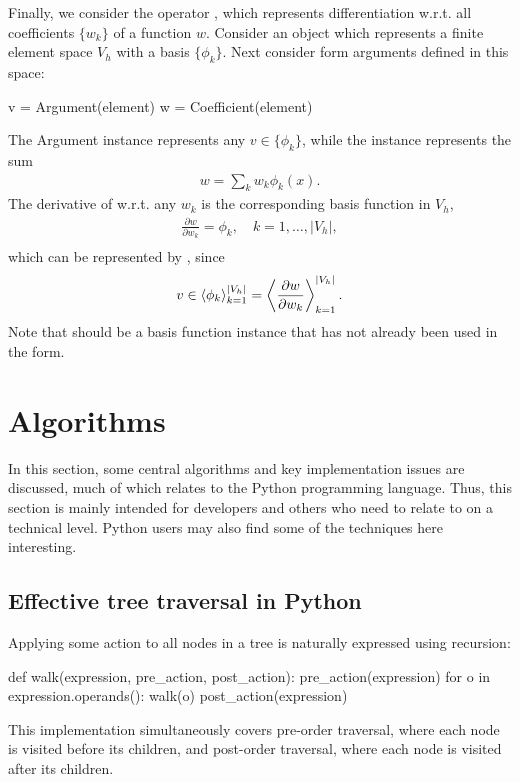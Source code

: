 Finally, we consider the operator , which represents
differentiation w.r.t. all coefficients $\{w_k\}$ of a function $w$.
Consider an object  which represents a finite element space
$V_h$ with a basis $\{\phi_k\}$.  Next consider form arguments defined
in this space:
\begin{python}
v = Argument(element)
w = Coefficient(element)
\end{python}
The Argument instance  represents any $v\in\{\phi_k\}$,
while the  instance  represents the sum
\begin{align}
w = \sum_k w_k \phi_k(x).
\end{align}
The derivative of  w.r.t. any $w_k$ is the corresponding basis
function in $V_h$,
\begin{align}
\frac{\partial w}{\partial w_k} = \phi_k, \quad k = 1, \ldots, |V_h|, \\
\end{align}
which can be represented by , since
\begin{align}
v \in \left\langle{ \phi_k }\right\rangle_{k=1}^{|V_h|} = \left\langle{ \frac{\partial w}{\partial w_k} }\right\rangle_{k=1}^{|V_h|}.
\end{align}
Note that  should be a basis function instance that has not
already been used in the form.

\section{Algorithms}
\label{ufl:sec:algorithms}

In this section, some central algorithms and key implementation issues
are discussed, much of which relates to the Python programming language.
Thus, this section is mainly intended for developers and others who need
to relate to \ufl{} on a technical level.  Python users may also find
some of the techniques here interesting.

\subsection{Effective tree traversal in Python}
\label{ufl:sec:traversal}


Applying some action to all nodes in a tree is naturally expressed
using recursion:
\begin{python}
def walk(expression, pre_action, post_action):
    pre_action(expression)
    for o in expression.operands():
        walk(o)
    post_action(expression)
\end{python}
This implementation simultaneously covers pre-order traversal, where
each node is visited before its children, and post-order traversal,
where each node is visited after its children.

